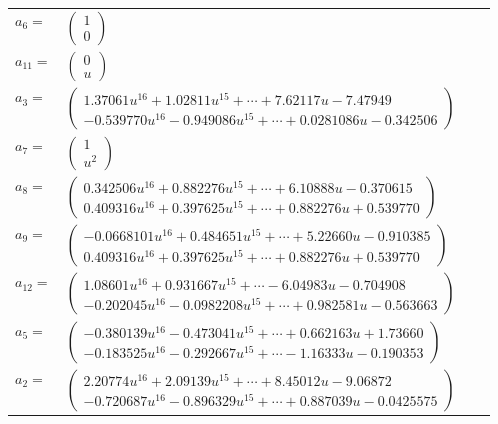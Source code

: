 \documentclass[1p]{elsarticle_modified}
\theoremstyle{definition}
\begin{document}
\begin{tabular}{m{7pt} m{180pt} m{7pt} m{180pt} }
\flushright $a_{6}=$&$\begin{pmatrix}1\\0\end{pmatrix}$ \\
\flushright $a_{11}=$&$\begin{pmatrix}0\\u\end{pmatrix}$ \\
\flushright $a_{3}=$&$\begin{pmatrix}1.37061 u^{16}+1.02811 u^{15}+\cdots+7.62117 u-7.47949\\-0.539770 u^{16}-0.949086 u^{15}+\cdots+0.0281086 u-0.342506\end{pmatrix}$ \\
\flushright $a_{7}=$&$\begin{pmatrix}1\\u^2\end{pmatrix}$ \\
\flushright $a_{8}=$&$\begin{pmatrix}0.342506 u^{16}+0.882276 u^{15}+\cdots+6.10888 u-0.370615\\0.409316 u^{16}+0.397625 u^{15}+\cdots+0.882276 u+0.539770\end{pmatrix}$ \\
\flushright $a_{9}=$&$\begin{pmatrix}-0.0668101 u^{16}+0.484651 u^{15}+\cdots+5.22660 u-0.910385\\0.409316 u^{16}+0.397625 u^{15}+\cdots+0.882276 u+0.539770\end{pmatrix}$ \\
\flushright $a_{12}=$&$\begin{pmatrix}1.08601 u^{16}+0.931667 u^{15}+\cdots-6.04983 u-0.704908\\-0.202045 u^{16}-0.0982208 u^{15}+\cdots+0.982581 u-0.563663\end{pmatrix}$ \\
\flushright $a_{5}=$&$\begin{pmatrix}-0.380139 u^{16}-0.473041 u^{15}+\cdots+0.662163 u+1.73660\\-0.183525 u^{16}-0.292667 u^{15}+\cdots-1.16333 u-0.190353\end{pmatrix}$ \\
\flushright $a_{2}=$&$\begin{pmatrix}2.20774 u^{16}+2.09139 u^{15}+\cdots+8.45012 u-9.06872\\-0.720687 u^{16}-0.896329 u^{15}+\cdots+0.887039 u-0.0425575\end{pmatrix}$ \\

\end{tabular}
\end{document}
